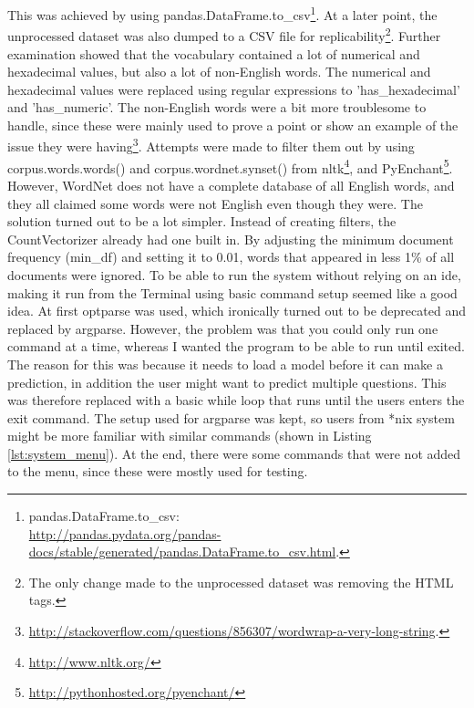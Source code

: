 This was achieved by using pandas.DataFrame.to\_csv\footnote{
	pandas.DataFrame.to\_csv: \\
	\url{http://pandas.pydata.org/pandas-docs/stable/generated/pandas.DataFrame.to_csv.html}.
	}. 
At a later point, the unprocessed dataset was also dumped to a CSV file for replicability\footnote{The only change made to the unprocessed dataset was removing the HTML tags.}.
\vspace{0.5em}\newline
Further examination showed that the vocabulary contained a lot of numerical and hexadecimal values, but also a lot of non-English words. 
The numerical and hexadecimal values were replaced using regular expressions to 'has\_hexadecimal' and 'has\_numeric'. 
The non-English words were a bit more troublesome to handle, since these were mainly used to prove a point or show an example of the issue they were having\footnote{ 
	\url{http://stackoverflow.com/questions/856307/wordwrap-a-very-long-string}.
	}. 
Attempts were made to filter them out by using corpus.words.words() and corpus.wordnet.synset() 
from \gls{nltk}\footnote{\url{http://www.nltk.org/}}, and PyEnchant\footnote{\url{http://pythonhosted.org/pyenchant/}}. 
However, WordNet does not have a complete database of all English words, and they all claimed some words were not English even though they were.
The solution turned out to be a lot simpler. 
Instead of creating filters, the CountVectorizer already had one built in. 
By adjusting the minimum document frequency (min\_df) and setting it to 0.01, words that appeared in less 1\% of all documents were ignored.
\vspace{0.5em}\newline
To be able to run the system without relying on an \gls{ide}, making it run from the Terminal using basic command setup seemed like a good idea. 
At first optparse was used, which ironically turned out to be deprecated and replaced by argparse. 
However, the problem was that you could only run one command at a time, whereas I wanted the program to be able to run until exited.
The reason for this was because it needs to load a model before it can make a prediction, in addition the user might want to predict multiple questions. 
This was therefore replaced with a basic while loop that runs until the users enters the exit command. 
The setup used for argparse was kept, so users from *nix system might be more familiar with similar commands (shown in Listing \ref{lst:system_menu}).
At the end, there were some commands that were not added to the menu, since these were mostly used for testing. 
